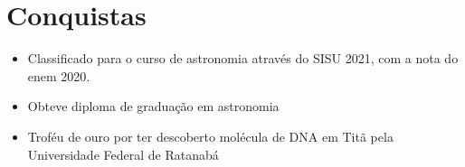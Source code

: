 \section{Conquistas}
\begin{itemize} %
    \item Classificado para o curso de astronomia através do SISU 2021, com a nota do enem 2020.
\end{itemize} %

\begin{itemize} %
    \item Obteve diploma de graduação em astronomia
\end{itemize} %

\begin{itemize} %
    \item Troféu de ouro por ter descoberto molécula de DNA em Titã pela Universidade Federal de Ratanabá
\end{itemize} %
